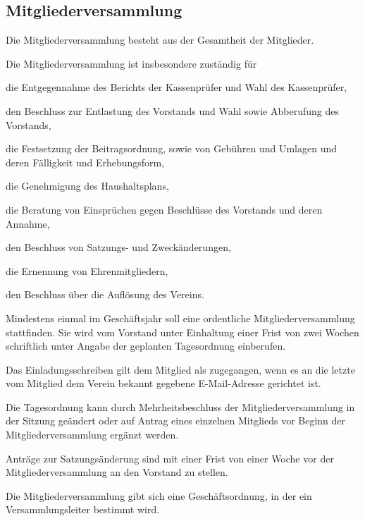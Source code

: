 \begin{contract}
\section{Mitgliederversammlung}
\begin{para}
	\item Die Mitgliederversammlung besteht aus der Gesamtheit der Mitglieder. 
	\item Die Mitgliederversammlung ist insbesondere zuständig für
	\begin{subpara}
		\item die Entgegennahme des Berichts der Kassenprüfer und Wahl des Kassenprüfer,
		\item den Beschluss zur Entlastung des Vorstands und Wahl sowie Abberufung des Vorstands,
		\item die Festsetzung der Beitragsordnung, sowie von Gebühren und Umlagen und deren Fälligkeit und Erhebungsform,
		\item die Genehmigung des Haushaltsplans,
		\item die Beratung von Einsprüchen gegen Beschlüsse des Vorstands und deren Annahme,
		\item den Beschluss von Satzungs- und Zweckänderungen,
		\item die Ernennung von Ehrenmitgliedern,
		\item den Beschluss über die Auflösung des Vereins.
	\end{subpara}
	\item Mindestens einmal im Geschäftsjahr soll eine ordentliche Mitgliederversammlung stattfinden. Sie wird vom Vorstand unter Einhaltung einer Frist von zwei Wochen schriftlich unter Angabe der geplanten Tagesordnung einberufen.
	\item Das Einladungsschreiben gilt dem Mitglied als zugegangen, wenn es an die letzte vom Mitglied dem Verein bekannt gegebene E-Mail-Adresse gerichtet ist.
	\item Die Tagesordnung kann durch Mehrheitsbeschluss der Mitgliederversammlung in der Sitzung geändert oder auf Antrag eines einzelnen Mitglieds vor Beginn der Mitgliederversammlung ergänzt werden.
	\item Anträge zur Satzungsänderung sind mit einer Frist von einer Woche vor der Mitgliederversammlung an den Vorstand zu stellen.
	\item Die Mitgliederversammlung gibt sich eine Geschäftsordnung, in der ein Versammlungsleiter bestimmt wird.

\end{para}
\end{contract}
